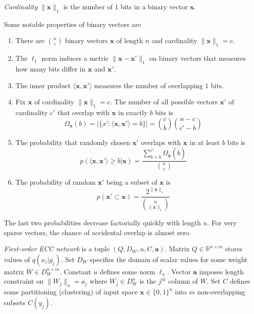 \documentclass[oneside,english,logo]{amuthesis}
\begin{document}
\begin{definition}
\textit{Cardinality} $\lVert\boldsymbol{x}\rVert_1$ is the number of $1$ bits in a binary vector $\boldsymbol{x}$. 
\end{definition}
\begin{theorem}
Some notable properties of binary vectors are
\begin{enumerate}
	\item There are $\binom{n}{c}$ binary vectors $\boldsymbol{x}$ of length $n$ and cardinality $\lVert\boldsymbol{x}\rVert_1=c$.
	\item The $\ell_1$ norm induces a metric $\lVert\boldsymbol{x}-\boldsymbol{x}'\rVert_1$ on  binary vectors that measures how many bits differ in $\boldsymbol{x}$ and $\boldsymbol{x}'$.
	\item The inner product $\langle\boldsymbol{x},\boldsymbol{x}'\rangle$ measures the number of overlapping $1$ bits. 
	\item Fix $\boldsymbol{x}$ of cardinality $\lVert\boldsymbol{x}\rVert_1=c$. The number of all possible vectors $\boldsymbol{x}'$ of cardinality $c'$ that overlap with $\boldsymbol{x}$ in exactly $b$ bits is 
	\[
	\Omega_{\boldsymbol{x}}(b)=|\{x':\langle\boldsymbol{x},\boldsymbol{x}'\rangle=b\}|=\binom{c}{b}\binom{n-c}{c'-b}
	\]
	\item The probability that randomly chosen $\boldsymbol{x}'$ overlaps with $\boldsymbol{x}$ in at least $b$ bits is
	\[p(\langle\boldsymbol{x},\boldsymbol{x}'\rangle\ge b | \boldsymbol{x})=\frac{\sum_{\dot{b}=b}^{c'}\Omega_{\boldsymbol{x}}(\dot{b})}{\binom{n}{c}}\]
	\item The probability of random $\boldsymbol{x}'$ being a subset of $\boldsymbol{x}$ is
	\[p(\boldsymbol{x}'\subset\boldsymbol{x})=\frac{2^{\lVert\boldsymbol{x}\rVert_1}}{\binom{n}{\lVert\boldsymbol{x}\rVert_1}}\]
	\label{theorem:sparse_bin_vecs_basics}
\end{enumerate}
\end{theorem}
The last two probabilities decrease factorially quickly with length $n$. For very sparse vectors, the chance of accidental overlap is almost zero. 


\begin{definition}
\textit{First-order ECC network} is a tuple $(Q,D_W,u,C,\boldsymbol{a})$. Matrix $Q\in \mathbb{R}^{n\times m}$ stores values of $q(x_i|y_j)$. Set $D_W$ specifies the domain of scalar values for some weight matrix $W\in D_W^{n \times m}$. Constant $u$ defines some norm $\ell_u$.  Vector $\boldsymbol{a}$ imposes length constraint on $\lVert W_j \rVert_u=a_j$ where $W_j\in D_W^n$ is the $j^{th}$ column of $W$. Set $C$ defines some partitioning (clustering) of input space $\boldsymbol{x}\in \{0,1\}^n$ into $m$ non-overlapping subsets $C(y_j) $.
\end{definition}
\end{document}
